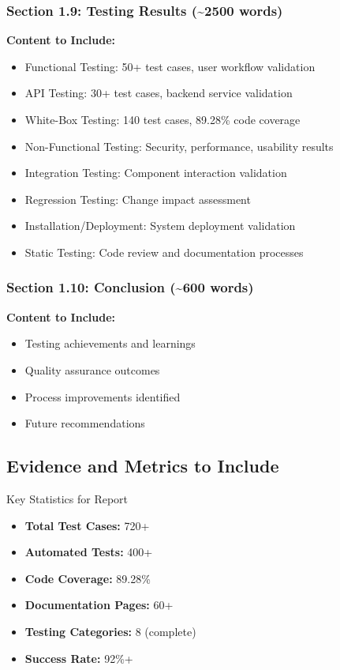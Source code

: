 \documentclass[12pt,a4paper]{article}
\begin{document}
\subsubsection{Section 1.9: Testing Results (\textasciitilde2500 words)}
\textbf{Content to Include:}
\begin{itemize}[leftmargin=*]
    \item Functional Testing: 50+ test cases, user workflow validation
    \item API Testing: 30+ test cases, backend service validation
    \item White-Box Testing: 140 test cases, 89.28\% code coverage
    \item Non-Functional Testing: Security, performance, usability results
    \item Integration Testing: Component interaction validation
    \item Regression Testing: Change impact assessment
    \item Installation/Deployment: System deployment validation
    \item Static Testing: Code review and documentation processes
\end{itemize}

\subsubsection{Section 1.10: Conclusion (\textasciitilde600 words)}
\textbf{Content to Include:}
\begin{itemize}[leftmargin=*]
    \item Testing achievements and learnings
    \item Quality assurance outcomes
    \item Process improvements identified
    \item Future recommendations
\end{itemize}

\subsection{Evidence and Metrics to Include}

\begin{infobox}{Key Statistics for Report}
\begin{itemize}[leftmargin=*]
    \item \textbf{Total Test Cases:} 720+
    \item \textbf{Automated Tests:} 400+
    \item \textbf{Code Coverage:} 89.28\%
    \item \textbf{Documentation Pages:} 60+
    \item \textbf{Testing Categories:} 8 (complete)
    \item \textbf{Success Rate:} 92\%+
\end{itemize}
\end{infobox}
\end{document}
